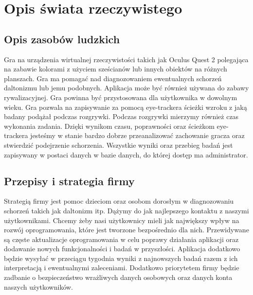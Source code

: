 \documentclass[12pt, letterpaper]{article}
\begin{document}
\newpage

\tableofcontents

\newpage


\section{Opis świata rzeczywistego}

	\subsection{Opis zasobów ludzkich}

	Gra na urządzenia wirtualnej rzeczywistości takich jak Oculus Quest 2 polegająca na zabawie kolorami z użyciem sześcianów lub innych obiektów na różnych planszach. Gra ma pomagać nad diagnozowaniem ewentualnych schorzeń daltonizmu lub jemu podobnych. Aplikacja może być również używana do zabawy rywalizacyjnej. Gra powinna być przystosowana dla użytkownika w dowolnym wieku. Gra pozwala na zapisywanie za pomocą eye-trackera ścieżki wzroku z jaką badany podążał podczas rozgrywki. Podczas rozgrywki mierzymy również czas wykonania zadania. Dzięki wynikom czasu, poprawności oraz ścieżkom eye-trackera jesteśmy w stanie bardzo dobrze przeanalizować zachowanie gracza oraz stwierdzić podejrzenie schorzenia. Wszystkie wyniki oraz przebieg badań jest zapisywany w postaci danych w bazie danych, do której dostęp ma administrator.
	

	\subsection{Przepisy i strategia firmy}
	
	Strategią firmy jest pomoc dzieciom oraz osobom dorosłym w diagnozowaniu schorzeń takich jak daltonizm itp. Dążymy do jak najlepszego kontaktu z naszymi użytkownikami. Chcemy żeby nasi użytkownicy mieli jak największy wpływ na rozwój oprogramowania, które jest tworzone bezpośrednio dla nich. Przewidywane są częste aktualizacje oprogramowania w celu poprawy działania aplikacji oraz dodawanie nowych funkcjonalności i badań w przyszłości. Aplikacja dodatkowo będzie wysyłać w przeciągu tygodnia wyniki z najnowszych badań razem z ich interpretacją i ewentualnymi zaleceniami. Dodatkowo priorytetem firmy będzie zadbanie o bezpieczeństwo wrażliwych danych osobowych oraz danych konta naszych użytkowników.
	
\end{document}
